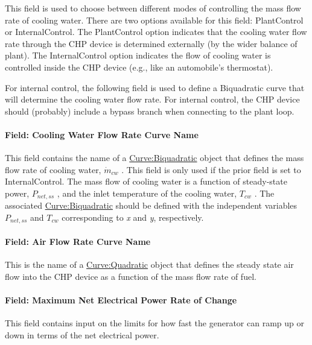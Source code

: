 This field is used to choose between different modes of controlling the mass flow rate of cooling water. There are two options available for this field: PlantControl or InternalControl. The PlantControl option indicates that the cooling water flow rate through the CHP device is determined externally (by the wider balance of plant). The InternalControl option indicates the flow of cooling water is controlled inside the CHP device (e.g., like an automobile's thermostat).

For internal control, the following field is used to define a Biquadratic curve that will determine the cooling water flow rate. For internal control, the CHP device should (probably) include a bypass branch when connecting to the plant loop.

\paragraph{Field: Cooling Water Flow Rate Curve Name}\label{field-cooling-water-flow-rate-curve-name}

This field contains the name of a \hyperref[curvebiquadratic]{Curve:Biquadratic} object that defines the mass flow rate of cooling water, \({\dot m_{cw}}\) . This field is only used if the prior field is set to InternalControl. The mass flow of cooling water is a function of steady-state power, \({P_{net,ss}}\) , and the inlet temperature of the cooling water, \({T_{cw}}\) . The associated \hyperref[curvebiquadratic]{Curve:Biquadratic} should be defined with the independent variables \({P_{net,ss}}\) and \({T_{cw}}\) corresponding to \emph{x} and \emph{y}, respectively.

\paragraph{Field: Air Flow Rate Curve Name}\label{field-air-flow-rate-curve-name}

This is the name of a \hyperref[curvequadratic]{Curve:Quadratic} object that defines the steady state air flow into the CHP device as a function of the mass flow rate of fuel.

\paragraph{Field: Maximum Net Electrical Power Rate of Change}\label{field-maximum-net-electrical-power-rate-of-change}

This field contains input on the limits for how fast the generator can ramp up or down in terms of the net electrical power.

